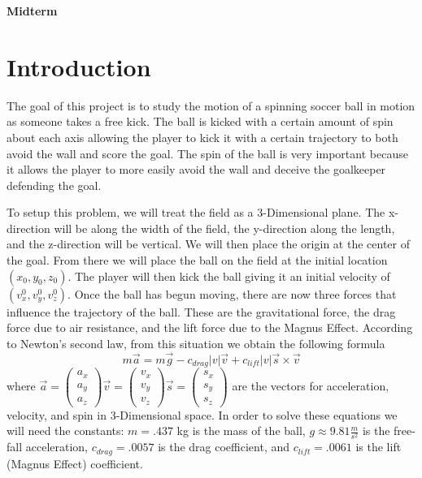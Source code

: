 \documentclass[12pt]{article}
\begin{document}
\centerline{\Large\textbf{Midterm}}
\vspace{.5cm}

\section*{Introduction}\label{sec::Intro}
The goal of this project is to study the motion of a spinning soccer ball in motion as someone takes a free kick. The ball is kicked with a certain amount of spin about each axis allowing the player to kick it with a certain trajectory to both avoid the wall and score the goal. The spin of the ball is very important because it allows the player to more easily avoid the wall and deceive the goalkeeper defending the goal.

To setup this problem, we will treat the field as a 3-Dimensional plane. The x-direction will be along the width of the field, the y-direction along the length, and the z-direction will be vertical. We will then place the origin at the center of the goal. From there we will place the ball on the field at the initial location $(x_{0}, y_{0}, z_{0})$. The player will then kick the ball giving it an initial velocity of $(v_{x}^{0}, v_{y}^{0}, v_{z}^{0})$. Once the ball has begun moving, there are now three forces that influence the trajectory of the ball. These are the gravitational force, the drag force due to air resistance, and the lift force due to the Magnus Effect. According to Newton's second law, from this situation we obtain the following formula
\begin{equation}
m\vec{a} = m\vec{g} - c_{drag}|v|\vec{v} + c_{lift}|v|\vec{s}\times \vec{v}
\end{equation}
where $\vec{a} = \begin{pmatrix}a_{x}\\a_{y}\\a_{z}\end{pmatrix} \vec{v} = \begin{pmatrix}v_{x}\\v_{y}\\v_{z}\end{pmatrix} \vec{s} = \begin{pmatrix}s_{x}\\s_{y}\\s_{z}\end{pmatrix}$ are the vectors for acceleration, velocity, and spin in 3-Dimensional space. In order to solve these equations we will need the constants: $m = .437$ kg is the mass of the ball, $g \approx 9.81\frac{m}{s^2}$ is the free-fall acceleration, $c_{drag} = .0057$ is the drag coefficient, and $c_{lift} = .0061$ is the lift (Magnus Effect) coefficient.
\end{document}
